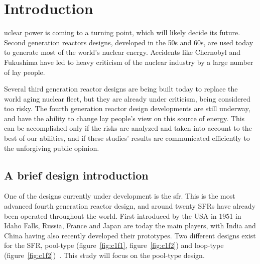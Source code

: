 %
%
\let\textcircled=\pgftextcircled
\chapter{Introduction}
\label{chap:intro}

uclear power is coming to a turning point, which will likely decide its future. Second generation reactors designs, developed in the 50s and 60s, are used today to generate most of the world's nuclear energy. Accidents like Chernobyl and Fukushima have led to heavy criticism of the nuclear industry by a large number of lay people.

Several third generation reactor designs are being built today to replace the world aging nuclear fleet, but they are already under criticism, being considered too risky. The fourth generation reactor design developments are still underway, and have the ability to change lay people's view on this source of energy. This can be accomplished only if the risks are analyzed and taken into account to the best of our abilities, and if these studies' results are communicated efficiently to the unforgiving public opinion.

\section{A brief design introduction}
\label{sec1:design_intro}


One of the designs currently under development is the \gls{sfr}. This is the most advanced fourth generation reactor design, and around twenty SFRs have already been operated throughout the world. First introduced by the USA in 1951 in Idaho Falls, Russia, France and Japan are today the main players, with India and China having also recently developed their prototypes. Two different designs exist for the SFR, pool-type (figure~\ref{fig:c1f1}, figure~\ref{fig:c1f2}) and loop-type (figure~\ref{fig:c1f2})~\cite{iaea01}. This study will focus on the pool-type design.


